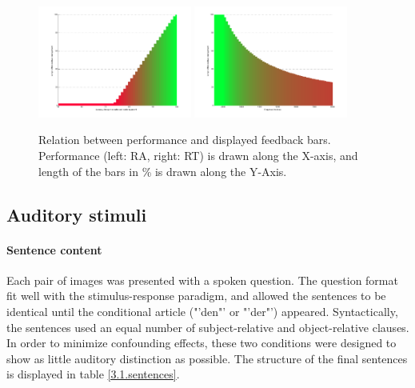 \begin{figure}[h]
\begin{center}
\vspace{7mm}
\includegraphics[width=0.45\textwidth]{pics/3_1_feedbackGraphAccuracy}
\includegraphics[width=0.45\textwidth]{pics/3_1_feedbackGraphRT}
\caption{\label{3.1.feedbackGraphs} Relation between performance and displayed feedback bars. Performance (left: RA, right: RT) is drawn along the X-axis, and length of the bars in \% is drawn along the Y-Axis.}
\end{center}
\end{figure}

\subsection{Auditory stimuli}

\paragraph{Sentence content}
Each pair of images was presented with a spoken question.
The question format fit well with the stimulus-response paradigm, and allowed the sentences to be identical until the conditional article ("'den"' or "'der"') appeared.
Syntactically, the sentences used an equal number of subject-relative and object-relative clauses.
In order to minimize confounding effects, these two conditions were designed to show as little auditory distinction as possible.
The structure of the final sentences is displayed in table \ref{3.1.sentences}.

